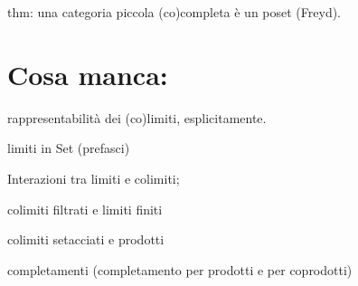 thm: una categoria piccola (co)completa è un poset (Freyd).

\section{Cosa manca:}

rappresentabilità dei (co)limiti, esplicitamente.

limiti in Set (prefasci)

Interazioni tra limiti e colimiti; 

colimiti filtrati e limiti finiti

colimiti setacciati e prodotti

completamenti (completamento per prodotti e per coprodotti)

